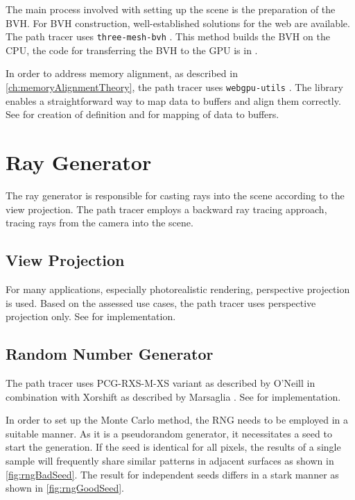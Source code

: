 The main process involved with setting up the scene is the preparation of the \gls{BVH}. For \gls{BVH} construction, well-established solutions for the web are available. The path tracer uses \texttt{three-mesh-bvh} \cite{threeMeshBvh}. This method builds the \gls{BVH} on the \gls{CPU}, the code for transferring the \gls{BVH} to the \gls{GPU} is in .

In order to address memory alignment, as described in \autoref{ch:memoryAlignmentTheory}, the path tracer uses \texttt{webgpu-utils} \cite{webgpuUtilsLib}. The library enables a straightforward way to map data to buffers and align them correctly. See  for creation of definition and  for mapping of data to buffers.


\section{Ray Generator}

The ray generator is responsible for casting rays into the scene according to the view projection. The path tracer employs a backward ray tracing approach, tracing rays from the camera into the scene.

\subsection*{View Projection}

For many applications, especially photorealistic rendering, perspective projection is used. Based on the assessed use cases, the path tracer uses perspective projection only. See  for implementation.

\subsection*{Random Number Generator}

The path tracer uses PCG-RXS-M-XS variant as described by O’Neill \cite{o2014pcg} in combination with Xorshift as described by Marsaglia \cite{marsaglia2003xorshift}. See  for implementation.

In order to set up the Monte Carlo method, the \gls{RNG} needs to be employed in a suitable manner. As it is a pseudorandom generator, it necessitates a seed to start the generation. If the seed is identical for all pixels, the results of a single sample will frequently share similar patterns in adjacent surfaces as shown in \autoref{fig:rngBadSeed}. The result for independent seeds differs in a stark manner as shown in \autoref{fig:rngGoodSeed}.


